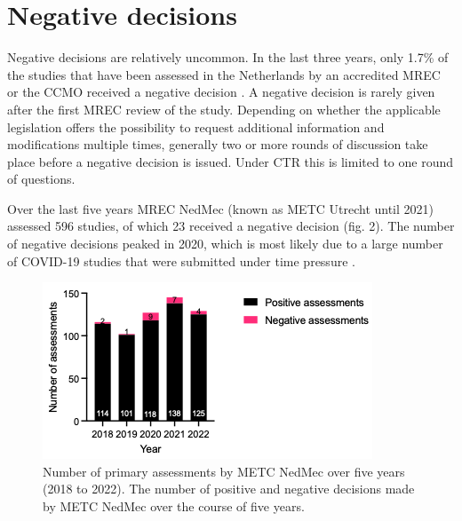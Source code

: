 \documentclass[authordate, empirical]{jote-new-article}
\begin{document}
	\section{Negative decisions}



	Negative decisions are relatively uncommon. In the last three years, only 1.7\% of the studies that have been assessed in the Netherlands by an accredited MREC or the CCMO received a negative decision \parencites{CCMO2023}. A negative decision is rarely given after the first MREC review of the study. Depending on whether the applicable legislation offers the possibility to request additional information and modifications multiple times, generally two or more rounds of discussion take place before a negative decision is issued. Under CTR this is limited to one round of questions.







	Over the last five years MREC NedMec (known as METC Utrecht until 2021) assessed 596 studies, of which 23 received a negative decision (fig. 2). The number of negative decisions peaked in 2020, which is most likely due to a large number of COVID-19 studies that were submitted under time pressure \parencites{METCUtrecht2020}.



	\begin{figure}
		\includegraphics[width=\linewidth]{media/Picture2.png}

		\caption{ Number of primary assessments by METC NedMec over five years (2018 to 2022). The number of positive and negative decisions made by METC NedMec over the course of five years.}

		\label{fig:rId12}


	\end{figure}
\end{document}
